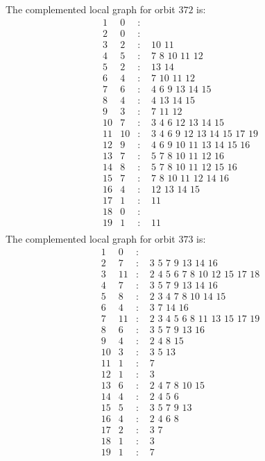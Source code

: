 \documentclass[12pt]{article}
\begin{document}
The complemented local graph for orbit $372$ is:
\begin{equation*}
\begin{array}{rrcl}
1&0&:&\\
2&0&:&\\
3&2&:&\,\,10\,\,11\\
4&5&:&\,\,7\,\,8\,\,10\,\,11\,\,12\\
5&2&:&\,\,13\,\,14\\
6&4&:&\,\,7\,\,10\,\,11\,\,12\\
7&6&:&\,\,4\,\,6\,\,9\,\,13\,\,14\,\,15\\
8&4&:&\,\,4\,\,13\,\,14\,\,15\\
9&3&:&\,\,7\,\,11\,\,12\\
10&7&:&\,\,3\,\,4\,\,6\,\,12\,\,13\,\,14\,\,15\\
11&10&:&\,\,3\,\,4\,\,6\,\,9\,\,12\,\,13\,\,14\,\,15\,\,17\,\,19\\
12&9&:&\,\,4\,\,6\,\,9\,\,10\,\,11\,\,13\,\,14\,\,15\,\,16\\
13&7&:&\,\,5\,\,7\,\,8\,\,10\,\,11\,\,12\,\,16\\
14&8&:&\,\,5\,\,7\,\,8\,\,10\,\,11\,\,12\,\,15\,\,16\\
15&7&:&\,\,7\,\,8\,\,10\,\,11\,\,12\,\,14\,\,16\\
16&4&:&\,\,12\,\,13\,\,14\,\,15\\
17&1&:&\,\,11\\
18&0&:&\\
19&1&:&\,\,11\\
\end{array}
\end{equation*}
The complemented local graph for orbit $373$ is:
\begin{equation*}
\begin{array}{rrcl}
1&0&:&\\
2&7&:&\,\,3\,\,5\,\,7\,\,9\,\,13\,\,14\,\,16\\
3&11&:&\,\,2\,\,4\,\,5\,\,6\,\,7\,\,8\,\,10\,\,12\,\,15\,\,17\,\,18\\
4&7&:&\,\,3\,\,5\,\,7\,\,9\,\,13\,\,14\,\,16\\
5&8&:&\,\,2\,\,3\,\,4\,\,7\,\,8\,\,10\,\,14\,\,15\\
6&4&:&\,\,3\,\,7\,\,14\,\,16\\
7&11&:&\,\,2\,\,3\,\,4\,\,5\,\,6\,\,8\,\,11\,\,13\,\,15\,\,17\,\,19\\
8&6&:&\,\,3\,\,5\,\,7\,\,9\,\,13\,\,16\\
9&4&:&\,\,2\,\,4\,\,8\,\,15\\
10&3&:&\,\,3\,\,5\,\,13\\
11&1&:&\,\,7\\
12&1&:&\,\,3\\
13&6&:&\,\,2\,\,4\,\,7\,\,8\,\,10\,\,15\\
14&4&:&\,\,2\,\,4\,\,5\,\,6\\
15&5&:&\,\,3\,\,5\,\,7\,\,9\,\,13\\
16&4&:&\,\,2\,\,4\,\,6\,\,8\\
17&2&:&\,\,3\,\,7\\
18&1&:&\,\,3\\
19&1&:&\,\,7\\
\end{array}
\end{equation*}
\end{document}

